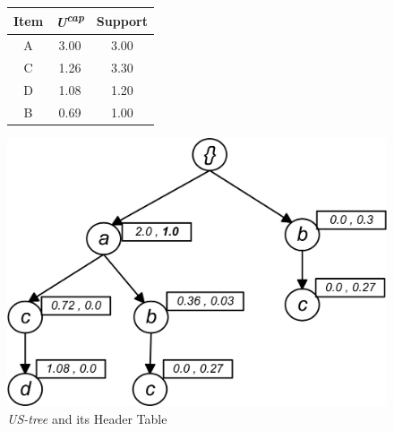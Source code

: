 %
\begin{figure}
\begin{minipage}{0.40\textwidth}
  \centering
  
	\begin{center}
	\begin{tabular}{ |c|c|c| } 
 	\hline
 		Item&\emph{U\textsuperscript{cap}}&Support\\ \hline\hline
 		A &  3.00  & 3.00\\ \hline
 		C &  1.26  & 3.30\\ \hline
 		D &  1.08  & 1.20\\ \hline
 		B &  0.69  & 1.00\\ \hline
\end{tabular}
\end{center}  
  
  
\end{minipage}
\hfill
\begin{minipage}{0.40\textwidth}
  \centering
  \includegraphics[width=\textwidth]{../images/M_TREE.jpg}
\end{minipage}


\caption{\emph{US-tree} and its Header Table}
\end{figure}
